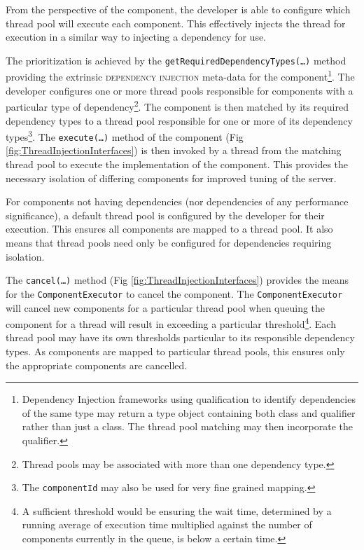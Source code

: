 \documentclass[prodmode]{style/acmlarge}
\begin{document}
From the perspective of the component, the developer is able to configure which
thread pool will execute each component.  This effectively injects the thread
for execution in a similar way to injecting a dependency for use.

The prioritization is achieved by the
\texttt{getRequiredDependencyTypes(\ldots)} method providing the extrinsic
\textsc{dependency injection} \cite{ioc} meta-data for the
component\footnote{Dependency Injection frameworks using qualification to
identify dependencies of the same type may return a type object containing both
class and qualifier rather than just a class.  The thread pool matching may then
incorporate the qualifier.}.  The developer configures one or more thread pools
responsible for components with a particular type of dependency\footnote{Thread
pools may be associated with more than one dependency type.}.  The component is
then matched by its required dependency types to a thread pool responsible for
one or more of its dependency types\footnote{The \texttt{componentId} may also
be used for very fine grained mapping.}.  The \texttt{execute(\ldots)} method of
the component (Fig \ref{fig:ThreadInjectionInterfaces}) is then invoked by a thread
from the matching thread pool to execute the implementation of the component.
This provides the necessary isolation of differing components for improved tuning
of the server.

For components not having dependencies (nor dependencies of any
performance significance), a default thread pool is configured by the developer
for their execution.  This ensures all components are mapped to a
thread pool.  It also means that thread pools need only be configured for
dependencies requiring isolation.

The \texttt{cancel(\ldots)} method (Fig \ref{fig:ThreadInjectionInterfaces})
provides the means for the \texttt{ComponentExecutor} to cancel the component. 
The \texttt{ComponentExecutor} will cancel new components for a particular
thread pool when queuing the component for a thread will result in exceeding a
particular threshold\footnote{A sufficient threshold would be ensuring the wait
time, determined by a running average of execution time multiplied against the
number of components currently in the queue, is below a certain time.}.  Each
thread pool may have its own thresholds particular to its responsible dependency
types.  As components are mapped to particular thread pools, this ensures only
the appropriate components are cancelled.
\end{document}
